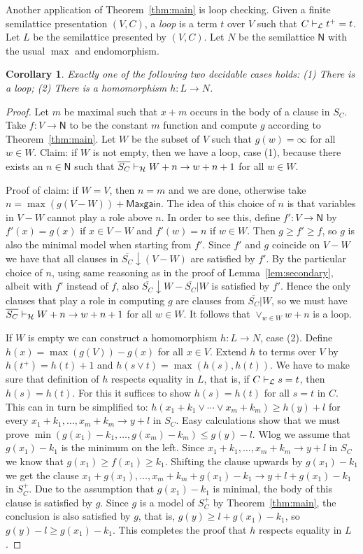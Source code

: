 \documentclass[11pt,a4paper]{article}
\newtheorem{corollary}[theorem]{Corollary}
\newcommand{\N}{\mathsf{N}}
\newcommand\jterm[3]{{{#1_1}+{#2_1}}\vee\cdots\vee{{#1_#3}+{#2_#3}}}
\newcommand\jbody[3]{{{#1_1}+{#2_1}},\ldots,{{#1_#3}+{#2_#3}}}
\newcommand\lathy{{\cal L}}
\newcommand\prvL{\vdash_{\lathy}}
\newcommand\prvH{\vdash_{\cal H}}
\newcommand\M{\mathsf{Maxgain}}
\newcommand\upS[1]{\overline{S_{#1}}}
\begin{document}
Another application of Theorem~\ref{thm:main} is loop checking.
Given a finite semilattice presentation $(V,C)$, a \emph{loop} is a 
term $t$ over $V$ such that $C\prvL t^+=t$. Let $L$ be the
semilattice presented by $(V,C)$. Let $N$ be the semilattice $\N$ with
the usual $\max$ and endomorphism.

\begin{corollary}\label{cor:loopchecking}
Exactly one of the following two decidable cases holds:
(1) There is a loop;
(2) There is a homomorphism $h: L\to N$.
\end{corollary}
\begin{proof}
Let $m$ be maximal such that $x+m$ occurs in the body of a clause in $S_C$.
Take $f: V\to\N$ to be the constant $m$ function and compute $g$ according
to Theorem~\ref{thm:main}. Let $W$ be the subset of $V$ such that 
$g(w)=\infty$ for all $w\in W$. Claim: if $W$ is not empty,
then we have a loop, case (1), because there exists an $n\in\N$ such that 
$\upS{C}\prvH W+n \to w+n+1$ for all $w\in W$.

Proof of claim: if $W=V$, then $n=m$ and we are done,
otherwise take $n= \max(g(V-W))+\M$. The idea of this choice of $n$ is 
that variables in $V-W$ cannot play a role above $n$.
In order to see this, define $f': V\to\N$ by $f'(x)=g(x)$ if $x\in V-W$
and $f'(w)=n$ if $w\in W$. Then $g\geqslant f'\geqslant f$, so $g$ is also the minimal 
model when starting from $f'$. Since $f'$ and $g$ coincide on $V-W$ we have
that all clauses in $\upS{C}{\downarrow}(V-W)$ are satisfied by $f'$.
By the particular choice of $n$, using same reasoning as in the proof of 
Lemma~\ref{lem:secondary}, albeit with $f'$ instead of $f$, also
$\upS{C}{\downarrow}W - \upS{C}|W$ is satisfied by $f'$.
Hence the only clauses that play a role in computing $g$ are
clauses from $\upS{C}|W$, so we must have 
$\upS{C}\prvH W+n \to w+n+1$ for all $w\in W$.
It follows that $\vee_{w\in W} w+n$ is a loop.

If $W$ is empty we can construct a homomorphism $h: L\to N$, case (2).
Define $h(x) = \max(g(V))- g(x)$ for all $x\in V$. 
Extend $h$ to terms over $V$ by $h(t^+) = h(t)+1$ 
and $h(s\vee t) = \max(h(s),h(t))$.
We have to make sure that definition of $h$ respects
equality in $L$, that is, if $C\prvL s=t$, then $h(s)=h(t)$.
For this it suffices to show $h(s)=h(t)$ for all $s=t$ in $C$.
This can in turn be simplified to: $h(\jterm{x}{k}{m}) \geqslant h(y)+l$ 
for every $\jbody{x}{k}{m} \to y+l$ in $S_C$.
Easy calculations show that we must prove
$\min(g(x_1)-k_1,\ldots,g(x_m)-k_m) \leqslant g(y)-l$.
Wlog we assume that $g(x_1)-k_1$ is the minimum on the left.
Since $\jbody{x}{k}{m} \to y+l$ in $S_C$ we know 
that $g(x_1)\geqslant f(x_1)\geqslant k_1$. Shifting the clause
upwards by $g(x_1)-k_1$ we get the clause
$x_1+g(x_1),\ldots,x_m+k_m+g(x_1)-k_1 \to y+l+g(x_1)-k_1$
in $S_C^+$. Due to the assumption that $g(x_1)-k_1$ is minimal,
the body of this clause is satisfied by $g$.
Since $g$ is a model of $S_C^+$ by Theorem~\ref{thm:main},
the conclusion is also satisfied by $g$, that is,
$g(y)\geqslant l+g(x_1)-k_1$, so $g(y)-l\geqslant g(x_1)-k_1$.
This completes the proof that $h$ respects equality in $L$.


\end{proof}
\end{document}
